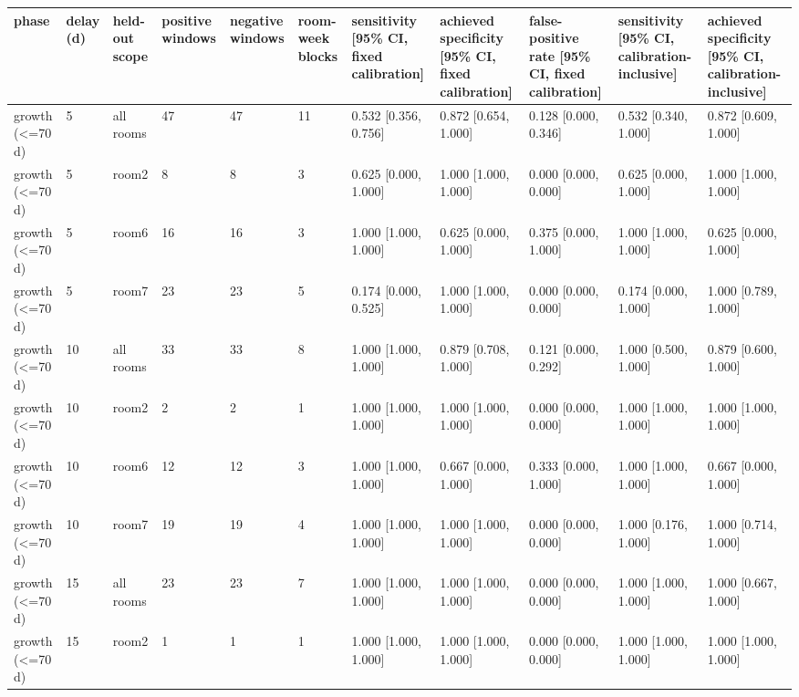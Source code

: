 \begin{tabular}{lllllllllll}
\hline
phase & delay (d) & held-out scope & positive windows & negative windows & room-week blocks & sensitivity [95\% CI, fixed calibration] & achieved specificity [95\% CI, fixed calibration] & false-positive rate [95\% CI, fixed calibration] & sensitivity [95\% CI, calibration-inclusive] & achieved specificity [95\% CI, calibration-inclusive] \\
\hline
growth (<=70 d) & 5 & all rooms & 47 & 47 & 11 & 0.532 [0.356, 0.756] & 0.872 [0.654, 1.000] & 0.128 [0.000, 0.346] & 0.532 [0.340, 1.000] & 0.872 [0.609, 1.000] \\
growth (<=70 d) & 5 & room2 & 8 & 8 & 3 & 0.625 [0.000, 1.000] & 1.000 [1.000, 1.000] & 0.000 [0.000, 0.000] & 0.625 [0.000, 1.000] & 1.000 [1.000, 1.000] \\
growth (<=70 d) & 5 & room6 & 16 & 16 & 3 & 1.000 [1.000, 1.000] & 0.625 [0.000, 1.000] & 0.375 [0.000, 1.000] & 1.000 [1.000, 1.000] & 0.625 [0.000, 1.000] \\
growth (<=70 d) & 5 & room7 & 23 & 23 & 5 & 0.174 [0.000, 0.525] & 1.000 [1.000, 1.000] & 0.000 [0.000, 0.000] & 0.174 [0.000, 1.000] & 1.000 [0.789, 1.000] \\
growth (<=70 d) & 10 & all rooms & 33 & 33 & 8 & 1.000 [1.000, 1.000] & 0.879 [0.708, 1.000] & 0.121 [0.000, 0.292] & 1.000 [0.500, 1.000] & 0.879 [0.600, 1.000] \\
growth (<=70 d) & 10 & room2 & 2 & 2 & 1 & 1.000 [1.000, 1.000] & 1.000 [1.000, 1.000] & 0.000 [0.000, 0.000] & 1.000 [1.000, 1.000] & 1.000 [1.000, 1.000] \\
growth (<=70 d) & 10 & room6 & 12 & 12 & 3 & 1.000 [1.000, 1.000] & 0.667 [0.000, 1.000] & 0.333 [0.000, 1.000] & 1.000 [1.000, 1.000] & 0.667 [0.000, 1.000] \\
growth (<=70 d) & 10 & room7 & 19 & 19 & 4 & 1.000 [1.000, 1.000] & 1.000 [1.000, 1.000] & 0.000 [0.000, 0.000] & 1.000 [0.176, 1.000] & 1.000 [0.714, 1.000] \\
growth (<=70 d) & 15 & all rooms & 23 & 23 & 7 & 1.000 [1.000, 1.000] & 1.000 [1.000, 1.000] & 0.000 [0.000, 0.000] & 1.000 [1.000, 1.000] & 1.000 [0.667, 1.000] \\
growth (<=70 d) & 15 & room2 & 1 & 1 & 1 & 1.000 [1.000, 1.000] & 1.000 [1.000, 1.000] & 0.000 [0.000, 0.000] & 1.000 [1.000, 1.000] & 1.000 [1.000, 1.000] \\

\end{tabular}

